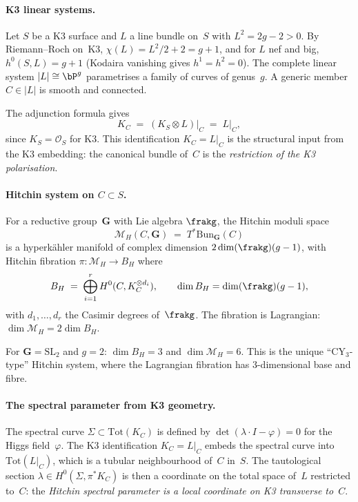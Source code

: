 \paragraph{K3 linear systems.}
Let $S$ be a K3 surface and $L$ a line bundle on~$S$ with $L^2 = 2g - 2 > 0$. By Riemann--Roch on~K3, $\chi(L) = L^2/2 + 2 = g + 1$, and for $L$ nef and big, $h^0(S, L) = g + 1$ (Kodaira vanishing gives $h^1 = h^2 = 0$). The complete linear system $|L| \cong \bP^g$ parametrises a family of curves of genus~$g$. A generic member $C \in |L|$ is smooth and connected.

The adjunction formula gives
\[
 K_C \;=\; (K_S \otimes L)\big|_C \;=\; L\big|_C,
\]
since $K_S = \mathcal{O}_S$ for K3. This identification $K_C = L|_C$ is the structural input from the K3 embedding: the canonical bundle of~$C$ is the \emph{restriction of the K3 polarisation}.

\paragraph{Hitchin system on \texorpdfstring{$C \subset S$}{C subset S}.}
For a reductive group~$\mathbf{G}$ with Lie algebra $\frakg$, the Hitchin moduli space
\[
 \mathcal{M}_H(C, \mathbf{G}) \;=\; T^*\mathrm{Bun}_\mathbf{G}(C)
\]
is a hyperk\"ahler manifold of complex dimension $2\dim(\frakg)(g-1)$, with Hitchin fibration $\pi\colon \mathcal{M}_H \to B_H$ where
\[
 B_H \;=\; \bigoplus_{i=1}^{r} H^0(C, K_C^{\otimes d_i}), \qquad \dim B_H = \dim(\frakg)(g-1),
\]
with $d_1, \ldots, d_r$ the Casimir degrees of~$\frakg$. The fibration is Lagrangian: $\dim \mathcal{M}_H = 2\dim B_H$.

For $\mathbf{G} = \mathrm{SL}_2$ and $g = 2$: $\dim B_H = 3$ and $\dim \mathcal{M}_H = 6$. This is the unique ``CY$_3$-type'' Hitchin system, where the Lagrangian fibration has $3$-dimensional base and fibre.

\paragraph{The spectral parameter from K3 geometry.}
The spectral curve $\Sigma \subset \mathrm{Tot}(K_C)$ is defined by $\det(\lambda \cdot I - \varphi) = 0$ for the Higgs field~$\varphi$. The K3 identification $K_C = L|_C$ embeds the spectral curve into $\mathrm{Tot}(L|_C)$, which is a tubular neighbourhood of~$C$ in~$S$. The tautological section $\lambda \in H^0(\Sigma, \pi^*K_C)$ is then a coordinate on the total space of~$L$ restricted to~$C$: the \emph{Hitchin spectral parameter is a local coordinate on K3 transverse to~$C$}.

